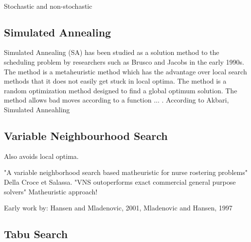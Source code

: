 


\ %


Stochastic and non-stochastic

\subsection{Simulated Annealing}

Simulated Annealing (SA) has been studied as a solution method to the scheduling problem by researchers such as Brusco and Jacobs in the early 1990s. The method is a metaheuristic method which has the advantage over local search methods that it does not easily get stuck in local optima. The method is a random optimization method designed to find a global optimum solution. The method allows bad moves according to a function ... . 
According to Akbari, Simulated Anneahling 

\subsection{Variable Neighbourhood Search}

Also avoids local optima. 

"A variable neighborhood search based matheuristic for nurse rostering problems" Della Croce et Salassa. "VNS outoperforms exact commercial general purpose solvers"
Matheuristic approach!

Early work by:
Hansen  and  Mladenovic, 2001, Mladenovic and Hansen, 1997

\subsection{Tabu Search}

